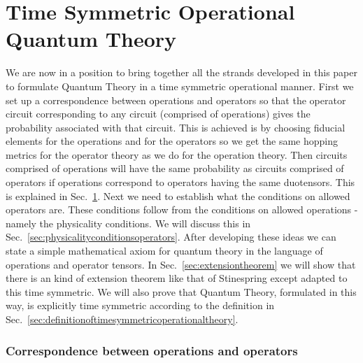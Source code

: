 \documentclass[10pt]{article}
\begin{document}
\part{Time Symmetric Operational Quantum Theory}\label{TSOQT}


We are now in a position to bring together all the strands developed in this paper to formulate Quantum Theory in a time symmetric operational manner.  First we set up a correspondence between operations and operators so that the operator circuit corresponding to any circuit (comprised of operations) gives the probability associated with that circuit.  This is achieved is by choosing fiducial elements for the operations and for the operators so we get the same hopping metrics for the operator theory as we do for the operation theory.  Then circuits comprised of operations will have the same probability as circuits comprised of operators if operations correspond to operators having the same duotensors.  This is explained in Sec.\ \ref{sec:correspondencebetweenoperationsandoperators}.  Next we need to establish what the conditions on allowed operators are. These conditions follow from the conditions on allowed operations - namely the physicality conditions. We will discuss this in Sec.\ \ref{sec:physicalityconditionsoperators}.  After developing these ideas we can state a simple mathematical axiom for quantum theory in the language of operations and operator tensors.  In Sec.\ \ref{sec:extensiontheorem} we will show that there is an kind of extension theorem like that of Stinespring \cite{stinespring1955positive} except adapted to this time symmetric.  We will also prove that Quantum Theory, formulated in this way, is explicitly time symmetric according to the definition in Sec.\ \ref{sec:definitionoftimesymmetricoperationaltheory}.


\section{Correspondence between operations and operators}\label{sec:correspondencebetweenoperationsandoperators}
\end{document}
